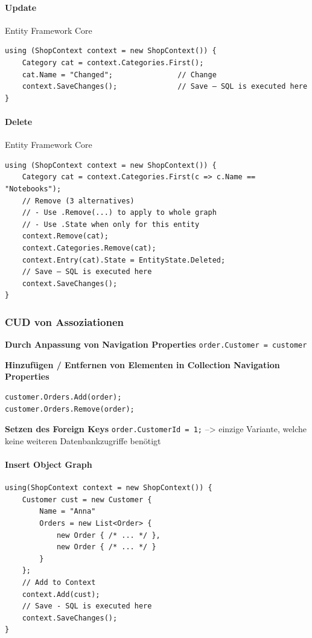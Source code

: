 \documentclass[
a4paper,
oneside,
10pt,
fleqn,
headsepline,
toc=listofnumbered, 
bibliography=totocnumbered]{scrartcl}
\begin{document}
\paragraph{Update} Entity Framework Core
\begin{lstlisting}
using (ShopContext context = new ShopContext()) {
    Category cat = context.Categories.First();
    cat.Name = "Changed";               // Change
    context.SaveChanges();              // Save – SQL is executed here
}
\end{lstlisting}

\paragraph{Delete} Entity Framework Core
\begin{lstlisting}
using (ShopContext context = new ShopContext()) {
    Category cat = context.Categories.First(c => c.Name == "Notebooks");
    // Remove (3 alternatives)
    // - Use .Remove(...) to apply to whole graph
    // - Use .State when only for this entity
    context.Remove(cat);
    context.Categories.Remove(cat);
    context.Entry(cat).State = EntityState.Deleted;
    // Save – SQL is executed here
    context.SaveChanges();              
}
\end{lstlisting}

\subsubsection{CUD von Assoziationen}
\textbf{Durch Anpassung von Navigation Properties}
\lstinline{order.Customer = customer}

\textbf{Hinzufügen / Entfernen von Elementen in Collection Navigation Properties}
\begin{lstlisting}
customer.Orders.Add(order);
customer.Orders.Remove(order);
\end{lstlisting}

\textbf{Setzen des Foreign Keys}
\lstinline{order.CustomerId = 1;}
--> einzige Variante, welche keine weiteren Datenbankzugriffe benötigt

\paragraph{Insert Object Graph}
\begin{lstlisting}
using(ShopContext context = new ShopContext()) {
    Customer cust = new Customer {
        Name = "Anna"
        Orders = new List<Order> {
            new Order { /* ... */ },
            new Order { /* ... */ }
        }
    };
    // Add to Context
    context.Add(cust);
    // Save - SQL is executed here
    context.SaveChanges();
}
\end{lstlisting}
\end{document}
